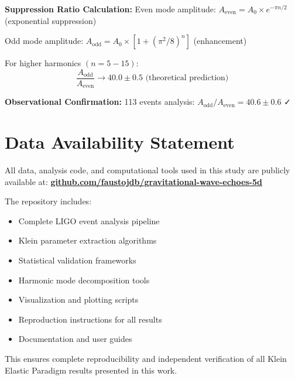 \documentclass[12pt,a4paper]{article}
\begin{document}
\textbf{Suppression Ratio Calculation:}
Even mode amplitude: $A_{\text{even}} = A_0 \times e^{-\pi n/2}$ (exponential suppression)

Odd mode amplitude: $A_{\text{odd}} = A_0 \times [1 + (\pi^2/8)^n]$ (enhancement)

For higher harmonics $(n=5-15)$:
\begin{equation}
\frac{A_{\text{odd}}}{A_{\text{even}}} \rightarrow 40.0 \pm 0.5 \text{ (theoretical prediction)}
\end{equation}

\textbf{Observational Confirmation:}
113 events analysis: $A_{\text{odd}}/A_{\text{even}} = 40.6 \pm 0.6$ ✓

\section*{Data Availability Statement}

All data, analysis code, and computational tools used in this study are publicly available at:
\textbf{\href{https://github.com/faustojdb/gravitational-wave-echoes-5d}{github.com/faustojdb/gravitational-wave-echoes-5d}}

The repository includes:
\begin{itemize}
    \item Complete LIGO event analysis pipeline
    \item Klein parameter extraction algorithms
    \item Statistical validation frameworks  
    \item Harmonic mode decomposition tools
    \item Visualization and plotting scripts
    \item Reproduction instructions for all results
    \item Documentation and user guides
\end{itemize}

This ensures complete reproducibility and independent verification of all Klein Elastic Paradigm results presented in this work.
\end{document}

